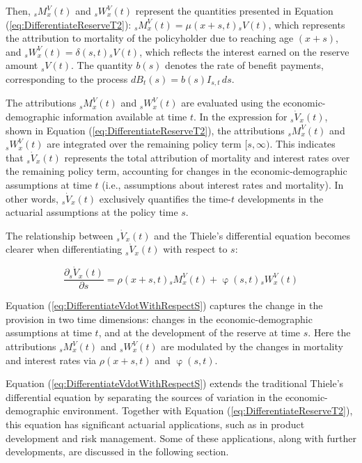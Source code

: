 \documentclass[12pt]{article}
\begin{document}
Then, ${}_sM^V_x(t)$ and ${}_sW^V_x(t)$ represent the quantities presented in Equation (\ref{eq:DifferentiateReserveT2}): ${}_sM^V_x(t) = \mu(x+s,t){}_sV(t)$, which represents the attribution to mortality of the policyholder due to reaching age $(x+s)$, and ${}_sW^V_x(t) = \delta(s,t){}_sV(t)$, which reflects the interest earned on the reserve amount ${}_sV(t)$. The quantity $b(s)$ denotes the rate of benefit payments, corresponding to the process $dB_t(s) = b(s) I_{s,t} \, ds$.

The attributions ${}_sM^V_x(t)$ and ${}_sW^V_x(t)$ are evaluated using the economic-demographic information available at time $t$. In the expression for ${}_s\dot{V}_x(t)$, shown in Equation (\ref{eq:DifferentiateReserveT2}), the attributions ${}_sM^V_x(t)$ and ${}_sW^V_x(t)$ are integrated over the remaining policy term $[s, \infty)$. This indicates that ${}_s\dot{V}_x(t)$ represents the total attribution of mortality and interest rates over the remaining policy term, accounting for changes in the economic-demographic assumptions at time $t$ (i.e., assumptions about interest rates and mortality). In other words, ${}_s\dot{V}_x(t)$ exclusively quantifies the time-$t$ developments in the actuarial assumptions at the policy time $s$.

 
The relationship between ${}_s\dot{V}_x(t)$ and the Thiele's differential equation becomes clearer when differentiating ${}_s\dot{V}_x(t)$ with respect to $s$: 

\begin{equation}\label{eq:DifferentiateVdotWithRespectS}
\dfrac{\partial	{}_s\dot{V}_x(t)}{\partial s}= \rho(x+s,t) {}_sM^V_x(t)+ \upvarphi(s,t) {}_sW^V_x(t)
\end{equation}

Equation (\ref{eq:DifferentiateVdotWithRespectS}) captures the change in the provision in two time dimensions: changes in the economic-demographic assumptions at time $t$, and at the development of the reserve at time $s$. 
Here the attributions ${}_sM^V_x(t)$ and ${}_sW^V_x(t)$ are modulated by the changes in mortality and interest rates via $\rho(x+s,t)$ and $\upvarphi(s,t)$.

Equation (\ref{eq:DifferentiateVdotWithRespectS}) extends the traditional Thiele’s differential equation by separating the sources of variation in the economic-demographic environment. Together with Equation (\ref{eq:DifferentiateReserveT2}), this equation has significant actuarial applications, such as in product development and risk management. Some of these applications, along with further developments, are discussed in the following section.
\end{document}
